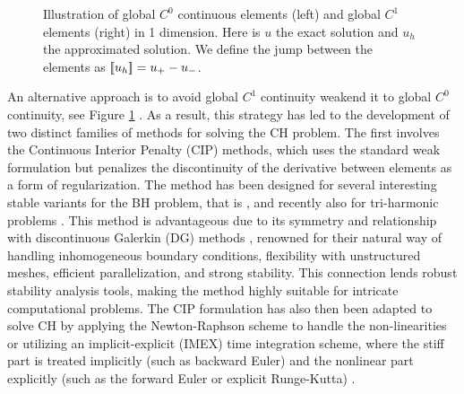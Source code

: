 \begin{figure}[h!]
\begin{minipage}{0.45\textwidth}
    \end{minipage}
\caption{ Illustration of global $C^{0}$ continuous elements (left) and global $C^{1}$ elements (right) in 1 dimension. Here is $u$ the exact solution and $u_{h}$ the approximated solution. We define the jump between the elements as $ \left[\!\left[  u_{h}  \right]\!\right] = u_{+} - u_{-}$.}
\label{fig:global_C0}
\end{figure}

An alternative approach is to avoid global $C^1$ continuity weakend it to global $C^{0}$ continuity, see Figure \ref{fig:global_C0} . As a result, this strategy has led to the development of two distinct families of methods for solving the CH problem.
The first involves the Continuous Interior Penalty (CIP) methods, which uses the standard weak formulation but penalizes the discontinuity of the derivative between elements as a form of regularization. The method has been designed for several interesting
stable variants for the BH problem, that is \cite{brenner2012, brenner2012quadratic, brenner2012quadratic_kirk, mu2014weak, georgoulis2009discontinuous}, and recently also for tri-harmonic problems \cite{diegel2023c0}.
This method is advantageous due to its symmetry and relationship with discontinuous Galerkin (DG) methods \cite{di2011mathematical}, renowned for their natural way of handling inhomogeneous boundary conditions, flexibility with unstructured meshes, efficient parallelization, and strong stability. This connection lends robust stability analysis tools, making the method highly suitable for intricate computational problems.
The CIP formulation has also then been adapted to solve CH by applying the Newton-Raphson scheme to handle the non-linearities \cite{wells2006discontinuous} or utilizing an implicit-explicit (IMEX) time integration scheme, where the stiff part is treated implicitly (such as backward Euler) and the nonlinear part explicitly (such as the forward
Euler or explicit Runge-Kutta) \cite{ feng2007fully}.

